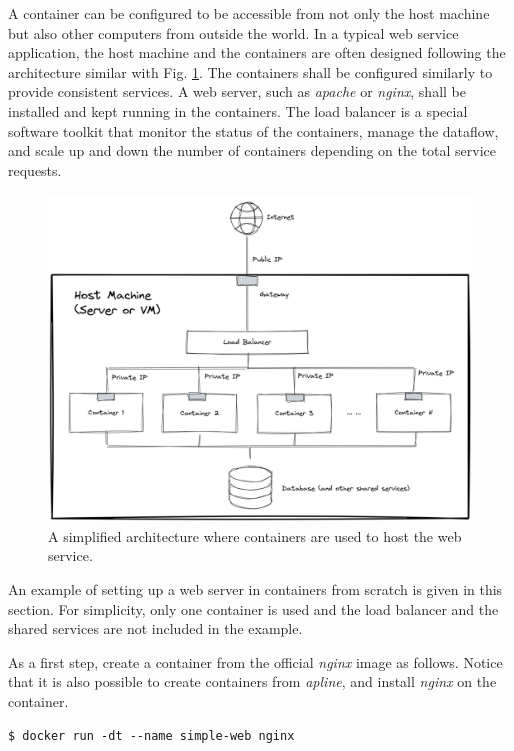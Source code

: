 A container can be configured to be accessible from not only the host machine but also other computers from outside the world. In a typical web service application, the host machine and the containers are often designed following the architecture similar with Fig. \ref{ch:vac:fig:containerwebserverarchitecture}. The containers shall be configured similarly to provide consistent services. A web server, such as \textit{apache} or \textit{nginx}, shall be installed and kept running in the containers. The load balancer is a special software toolkit that monitor the status of the containers, manage the dataflow, and scale up and down the number of containers depending on the total service requests.
\begin{figure}
	\centering
	\includegraphics[width=350pt]{chapters/ch_virtualization_and_containerization/figures/containerwebserverarchitecture.png}
	\caption{A simplified architecture where containers are used to host the web service.} \label{ch:vac:fig:containerwebserverarchitecture}
\end{figure}

An example of setting up a web server in containers from scratch is given in this section. For simplicity, only one container is used and the load balancer and the shared services are not included in the example.

As a first step, create a container from the official \textit{nginx} image as follows. Notice that it is also possible to create containers from \textit{apline}, and install \textit{nginx} on the container.
\begin{lstlisting}
$ docker run -dt --name simple-web nginx
\end{lstlisting}

